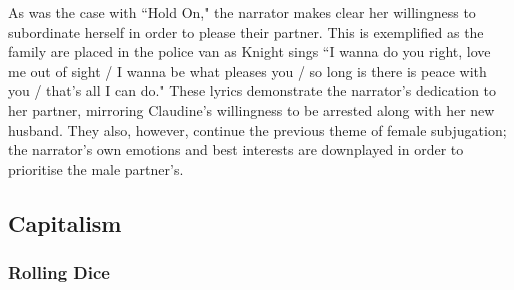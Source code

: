 As was the case with ``Hold On," the narrator makes clear her willingness to subordinate herself in order to please their partner.
This is exemplified as the family are placed in the police van as Knight sings ``I wanna do you right, love me out of sight / I wanna be what pleases you / so long is there is peace with you / that's all I can do."
These lyrics demonstrate the narrator's dedication to her partner, mirroring Claudine's willingness to be arrested along with her new husband.
They also, however, continue the previous theme of female subjugation; the narrator's own emotions and best interests are downplayed in order to prioritise the male partner's.


\subsection{Capitalism}

\subsubsection{Rolling Dice}

